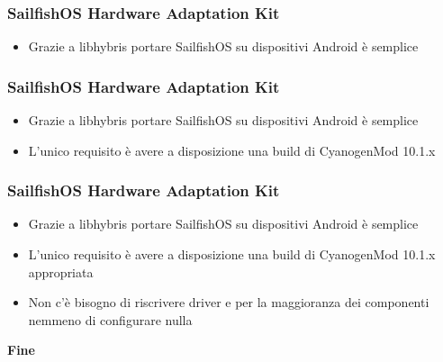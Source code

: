 \documentclass[12pt]{beamer}
\begin{document}
\begin{frame}
	\frametitle{SailfishOS Hardware Adaptation Kit}
	\begin{itemize}
		\item Grazie a libhybris portare SailfishOS su dispositivi Android è semplice
	\end{itemize}
\end{frame}

\begin{frame}
	\frametitle{SailfishOS Hardware Adaptation Kit}
	\begin{itemize}
		\item Grazie a libhybris portare SailfishOS su dispositivi Android è semplice
		\item L'unico requisito è avere a disposizione una build di CyanogenMod 10.1.x
	\end{itemize}
\end{frame}

\begin{frame}
	\frametitle{SailfishOS Hardware Adaptation Kit}
	\begin{itemize}
		\item Grazie a libhybris portare SailfishOS su dispositivi Android è semplice
		\item L'unico requisito è avere a disposizione una build di CyanogenMod 10.1.x appropriata
		\item Non c'è bisogno di riscrivere driver e per la maggioranza dei componenti nemmeno di configurare nulla
	\end{itemize}
\end{frame}

\begin{frame}
	\begin{center}
		\textbf{Fine}
	\end{center}
\end{frame}
\end{document}
